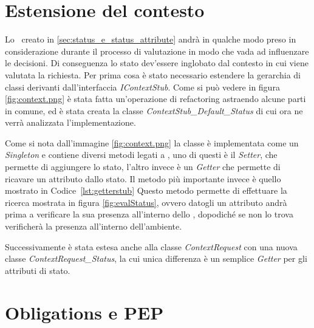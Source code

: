\section{Estensione del contesto} %
\label{sec:estensione_del_contesto}

Lo \status \ creato in \ref{sec:status_e_status_attribute} andrà in qualche modo preso in considerazione durante il processo di valutazione in modo che vada ad influenzare le decisioni.
Di conseguenza lo stato dev'essere inglobato dal contesto in cui viene valutata la richiesta.
Per prima cosa è stato necessario estendere la gerarchia di classi derivanti dall'interfaccia \textit{IContextStub}. Come si può vedere in figura \ref{fig:context.png} è stata fatta un'operazione di refactoring astraendo alcune parti in comune, ed è stata creata la classe \textit{ContextStub\_Default\_Status} di cui ora ne verrà analizzata l'implementazione.\\ \par
Come si nota dall'immagine \ref{fig:context.png} la classe è implementata come un \textit{Singleton} e contiene diversi metodi legati a \status, uno di questi è il \textit{Setter}, che permette di aggiungere lo stato, l'altro invece è un \textit{Getter} che permette di ricavare un attributo dallo stato.
Il metodo più importante invece è quello mostrato in Codice~\ref{lst:getterstub}
Questo metodo permette di effettuare la ricerca mostrata in figura \ref{fig:evalStatus}, ovvero datogli un attributo andrà prima a verificare la sua presenza all'interno dello \status, dopodiché se non lo trova verificherà la presenza all'interno dell'ambiente.\\ \par
Successivamente è stata estesa anche alla classe \textit{ContextRequest} con una nuova classe \textit{ContextRequest\_Status}, la cui unica differenza è un semplice \textit{Getter} per gli attributi di stato.

\section{Obligations e PEP} %
\label{sec:obligations_e_pep}

